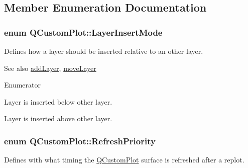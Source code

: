 \subsection{Member Enumeration Documentation}
\subsubsection[{\texorpdfstring{Layer\+Insert\+Mode}{LayerInsertMode}}]{\setlength{\rightskip}{0pt plus 5cm}enum {\bf Q\+Custom\+Plot\+::\+Layer\+Insert\+Mode}}\hypertarget{classQCustomPlot_a75a8afbe6ef333b1f3d47abb25b9add7}{}\label{classQCustomPlot_a75a8afbe6ef333b1f3d47abb25b9add7}
Defines how a layer should be inserted relative to an other layer.

\begin{DoxySeeAlso}{See also}
\hyperlink{classQCustomPlot_ad5255393df078448bb6ac83fa5db5f52}{add\+Layer}, \hyperlink{classQCustomPlot_ae896140beff19424e9e9e02d6e331104}{move\+Layer} 
\end{DoxySeeAlso}
\begin{Desc}
\item[Enumerator]\par
\begin{description}
\item[{\em 
lim\+Below\hypertarget{classQCustomPlot_a75a8afbe6ef333b1f3d47abb25b9add7aee39cf650cd24e68552da0b697ce4a93}{}\label{classQCustomPlot_a75a8afbe6ef333b1f3d47abb25b9add7aee39cf650cd24e68552da0b697ce4a93}
}]Layer is inserted below other layer. \item[{\em 
lim\+Above\hypertarget{classQCustomPlot_a75a8afbe6ef333b1f3d47abb25b9add7a062b0b7825650b432a713c0df6742d41}{}\label{classQCustomPlot_a75a8afbe6ef333b1f3d47abb25b9add7a062b0b7825650b432a713c0df6742d41}
}]Layer is inserted above other layer. \end{description}
\end{Desc}
\subsubsection[{\texorpdfstring{Refresh\+Priority}{RefreshPriority}}]{\setlength{\rightskip}{0pt plus 5cm}enum {\bf Q\+Custom\+Plot\+::\+Refresh\+Priority}}\hypertarget{classQCustomPlot_a45d61392d13042e712a956d27762aa39}{}\label{classQCustomPlot_a45d61392d13042e712a956d27762aa39}
Defines with what timing the \hyperlink{classQCustomPlot}{Q\+Custom\+Plot} surface is refreshed after a replot.

